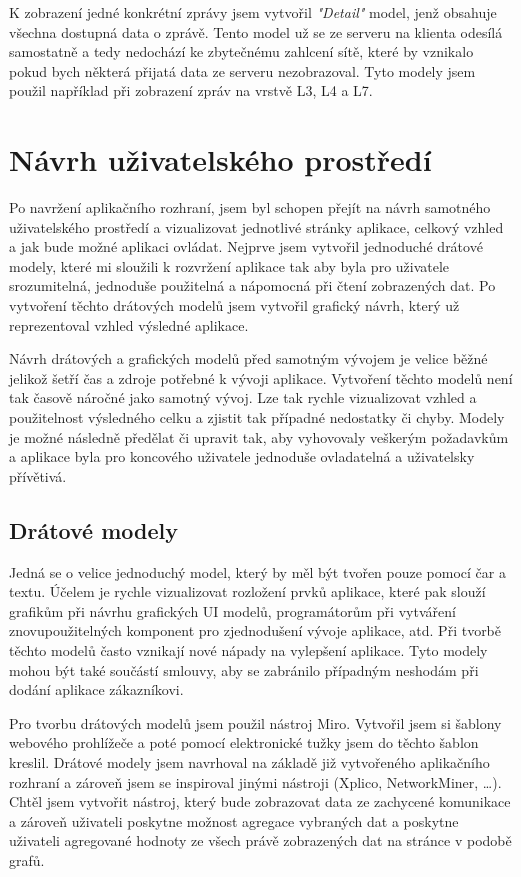         K zobrazení jedné konkrétní zprávy jsem vytvořil \textit{"Detail"} model, jenž obsahuje všechna dostupná data o zprávě. Tento model už se ze serveru na klienta odesílá samostatně a tedy nedochází ke zbytečnému zahlcení sítě, které by vznikalo pokud bych některá přijatá data ze serveru nezobrazoval. Tyto modely jsem použil například při zobrazení zpráv na vrstvě L3, L4 a L7.
        
\section{Návrh uživatelského prostředí}
Po navržení aplikačního rozhraní, jsem byl schopen přejít na návrh samotného uživatelského prostředí a vizualizovat jednotlivé stránky aplikace, celkový vzhled a jak bude možné aplikaci ovládat. Nejprve jsem vytvořil jednoduché drátové modely, které mi sloužili k rozvržení aplikace tak aby byla pro uživatele srozumitelná, jednoduše použitelná a nápomocná při čtení zobrazených dat. Po vytvoření těchto drátových modelů jsem vytvořil grafický návrh, který už reprezentoval vzhled výsledné aplikace.

Návrh drátových a grafických modelů před samotným vývojem je velice běžné jelikož šetří čas a zdroje potřebné k vývoji aplikace. Vytvoření těchto modelů není tak časově náročné jako samotný vývoj. Lze tak rychle vizualizovat vzhled a použitelnost výsledného celku a zjistit tak případné nedostatky či chyby. Modely je možné následně předělat či upravit tak, aby vyhovovaly veškerým požadavkům a aplikace byla pro koncového uživatele jednoduše ovladatelná a uživatelsky přívětivá.

    \subsection{Drátové modely}
    Jedná se o velice jednoduchý model, který by měl být tvořen pouze pomocí čar a textu. Účelem je rychle vizualizovat rozložení prvků aplikace, které pak slouží grafikům při návrhu grafických UI modelů, programátorům při vytváření znovupoužitelných komponent pro zjednodušení vývoje aplikace, atd. Při tvorbě těchto modelů často vznikají nové nápady na vylepšení aplikace. Tyto modely mohou být také součástí smlouvy, aby se zabránilo případným neshodám při dodání aplikace zákazníkovi.
    
    Pro tvorbu drátových modelů jsem použil nástroj Miro. Vytvořil jsem si šablony webového prohlížeče a poté pomocí elektronické tužky jsem do těchto šablon kreslil. Drátové modely jsem navrhoval na základě již vytvořeného aplikačního rozhraní a zároveň jsem se inspiroval jinými nástroji (Xplico, NetworkMiner, …). Chtěl jsem vytvořit nástroj, který bude zobrazovat data ze zachycené komunikace a zároveň uživateli poskytne možnost agregace vybraných dat a poskytne uživateli agregované hodnoty ze všech právě zobrazených dat na stránce v podobě grafů. 

